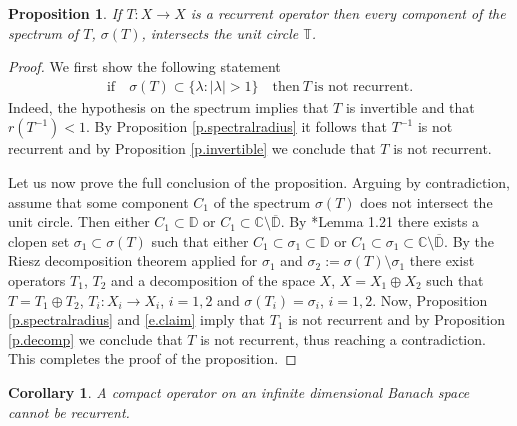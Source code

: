 \documentclass[12pt,leqno]{amsart}
\theoremstyle{plain}
\newtheorem{proposition}[equation]{Proposition}
\newtheorem{corollary}[equation]{Corollary}
\theoremstyle{definition}
\numberwithin{equation}{section}
\begin{document}
\begin{proposition}
	\label{p.spectrum} If $T:X\to X$ is a recurrent operator then every component of the spectrum of $T$, $\sigma (T)$, intersects the unit circle $ \mathbb T$. 
\end{proposition}

\begin{proof}
	We first show the following statement 
	\begin{align}
		\label{e.claim} \text{if}\quad \sigma (T)\subset \{ \lambda : |\lambda | >1 \}\quad \text{then}\ T \ \text{is not recurrent.} 
	\end{align}
	Indeed, the hypothesis on the spectrum implies that $T$ is invertible and that $r(T^{-1})<1$. By Proposition \ref{p.spectralradius} it follows that $T^{-1}$ is not recurrent and by Proposition \ref{p.invertible} we conclude that $T$ is not recurrent.
	
	Let us now prove the full conclusion of the proposition. Arguing by contradiction, assume that some component $C_1$ of the spectrum $\sigma (T)$ does not intersect the unit circle. Then either $C_1\subset \mathbb D$ or $C_1\subset \mathbb C \setminus \overline{\mathbb D}$. By \cite{BM}*{Lemma 1.21} there exists a clopen set $\sigma_1 \subset \sigma (T)$ such that either $C_1\subset \sigma_1 \subset \mathbb D$ or $C_1\subset \sigma_1\subset \mathbb C \setminus \overline{\mathbb D}$. By the Riesz decomposition theorem applied for $\sigma_1$ and $\sigma_2:=\sigma (T) \setminus \sigma_1$ there exist operators $T_1$, $T_2$ and a decomposition of the space $X$, $X=X_1\oplus X_2$ such that $T=T_1\oplus T_2$, $T_i:X_i\to X_i$, $i=1,2$ and $\sigma (T_i)=\sigma_i$, $i=1,2$. Now, Proposition \ref{p.spectralradius} and \eqref{e.claim} imply that $T_1$ is not recurrent and by Proposition \ref{p.decomp} we conclude that $T$ is not recurrent, thus reaching a contradiction. This completes the proof of the proposition. 
\end{proof}

\begin{corollary}
	A compact operator on an infinite dimensional Banach space cannot be recurrent. 
\end{corollary}
\end{document}

